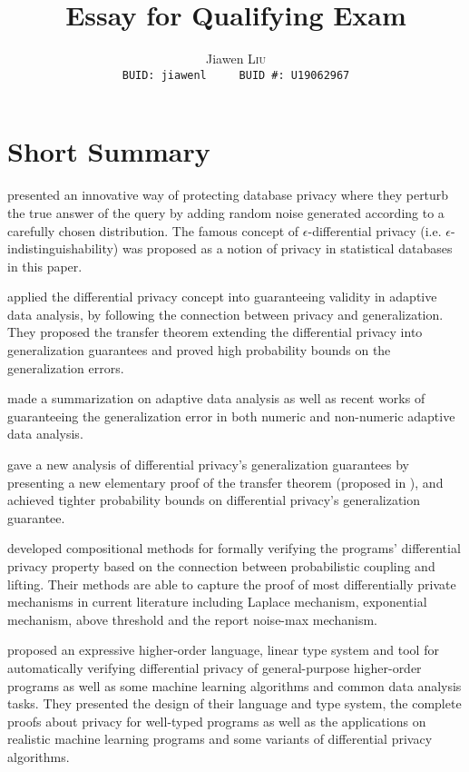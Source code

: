 \documentclass{article}
\title{\textbf{Essay for Qualifying Exam}
}
\author{
Jiawen \textsc{Liu}\\
\texttt{BUID: jiawenl \ \ \ \ BUID \#: U19062967}
}
\date{}
\begin{document}
\maketitle 

\section{Short Summary}
\cite{dwork2006calibrating} presented an innovative way of protecting database privacy where they perturb the true answer of the query by adding random noise generated according to a carefully chosen distribution. 
The famous concept of $\epsilon$-differential privacy (i.e. $\epsilon$-indistinguishability) was proposed as a notion of privacy in statistical databases in this paper.


\cite{dwork2015preserving} applied the differential privacy concept into guaranteeing validity in adaptive data analysis, by following the connection between privacy and generalization.
They proposed the transfer theorem extending the differential privacy into generalization guarantees and proved high probability bounds on the generalization errors.

\cite{smith2017information} made a summarization on adaptive data analysis as well as recent works of guaranteeing the generalization error in both numeric and non-numeric adaptive data analysis.

\cite{jung2019new} gave a new analysis of differential privacy's generalization guarantees by presenting a new elementary proof of the transfer theorem (proposed in \cite{dwork2015generalization}), and achieved tighter probability bounds on differential privacy's generalization guarantee.

\cite{barthe2016proving} developed compositional methods for formally verifying the programs' differential privacy property based on the connection between probabilistic coupling and lifting. Their methods are able to capture the proof of most differentially private mechanisms in current literature including Laplace mechanism, exponential mechanism, above threshold and the report noise-max mechanism.

\cite{near2019duet} proposed an expressive higher-order language, linear type system and tool for automatically verifying differential privacy of general-purpose higher-order programs as well as some machine learning algorithms and common data analysis tasks. They presented the design of their language and type system, the complete proofs about privacy for well-typed programs as well as the applications on realistic machine learning programs and some variants of differential privacy  algorithms.
\end{document}
